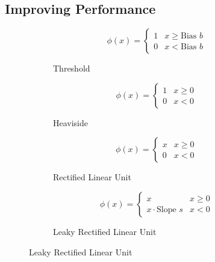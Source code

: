 \subsection{Improving Performance}
\label{sec:neural-networks-improving-percofrmance}
\begin{figure}
	\setlength{}
	\setlength{}
	\centering
	\begin{subfigure}{.5\textwidth}
		\centering
		
		\begin{equation*}
			\phi(x) =
			\begin{cases}
				1 & x \geq \text{Bias $b$} \\
				0 & x < \text{Bias $b$}
			\end{cases}
		\end{equation*}
		\caption{Threshold}
		\label{fig:threshold-activation}
	\end{subfigure}%
	\hfill
	\begin{subfigure}{.5\textwidth}
		\centering
		
		\begin{equation*}
			\phi(x) =
			\begin{cases}
				1 & x \geq 0 \\
				0 & x < 0
			\end{cases}
		\end{equation*}
		\caption{Heaviside}
		\label{fig:heaviside-activation}
	\end{subfigure}
	
	\begin{subfigure}{.5\textwidth}
		\centering
		
		\begin{equation*}
			\phi(x) =
			\begin{cases}
				x & x \geq 0 \\
				0 & x < 0
			\end{cases}
		\end{equation*}
		\caption{Rectified Linear Unit}
		\label{fig:relu-activation}
	\end{subfigure}%
	\hfill
	\begin{subfigure}{.5\textwidth}
			\centering
			
			\begin{equation*}
				\phi(x) =
				\begin{cases}
					x & x \geq 0 \\
					x\cdot \text{Slope $s$} & x < 0
				\end{cases}
			\end{equation*}
			\caption{Leaky Rectified Linear Unit}
			\label{fig:leakyrelu-activation}
		\end{subfigure}
	

\end{figure}
